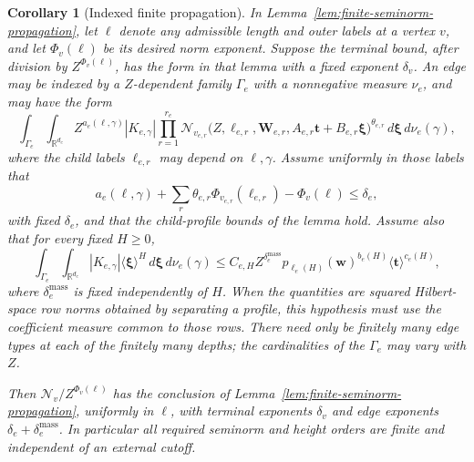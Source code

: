 \documentclass[11pt,a4paper]{article}
\numberwithin{equation}{section}
\numberwithin{figure}{section}
\newtheorem{corollary}[theorem]{Corollary}
\theoremstyle{definition}
\theoremstyle{remark}
\begin{document}
\begin{corollary}[Indexed finite propagation]
\label{cor:indexed-seminorm-propagation}
In Lemma~\ref{lem:finite-seminorm-propagation}, let
$\boldsymbol\ell$ denote any admissible length and outer labels at a vertex
$v$, and let $\Phi_v(\boldsymbol\ell)$ be its desired norm exponent.  Suppose
the terminal bound, after division by $Z^{\Phi_v(\boldsymbol\ell)}$, has the
form in that lemma with a fixed exponent $\delta_v$.  An edge may be indexed
by a $Z$-dependent family $\Gamma_e$ with a nonnegative measure $\nu_e$, and
may have the form
\[
 \int_{\Gamma_e}\int_{\mathbb R^{d_e}}
 Z^{a_e(\boldsymbol\ell,\gamma)}|K_{e,\gamma}|
 \prod_{r=1}^{r_e}\mathcal N_{v_{e,r}}
  \bigl(Z,\boldsymbol\ell_{e,r},\boldsymbol W_{e,r},
        A_{e,r}\boldsymbol t+B_{e,r}\boldsymbol\xi\bigr)^{\theta_{e,r}}
 \,d\boldsymbol\xi\,d\nu_e(\gamma),
\]
where the child labels $\boldsymbol\ell_{e,r}$ may depend on
$\boldsymbol\ell,\gamma$.  Assume uniformly in those labels that
\begin{equation}\label{eq:indexed-exponent-defect}
 a_e(\boldsymbol\ell,\gamma)
   +\sum_r\theta_{e,r}\Phi_{v_{e,r}}(\boldsymbol\ell_{e,r})
   -\Phi_v(\boldsymbol\ell)\le\delta_e,
\end{equation}
with fixed $\delta_e$, and that the child-profile bounds of the lemma hold.
Assume also that for every fixed $H\ge0$,
\begin{equation}\label{eq:indexed-coefficient-measure}
 \int_{\Gamma_e}\int_{\mathbb R^{d_e}}|K_{e,\gamma}|
       \langle\boldsymbol\xi\rangle^H\,d\boldsymbol\xi\,d\nu_e(\gamma)
 \le C_{e,H}Z^{\delta_e^{\mathrm{mass}}}
       p_{\ell_e(H)}(\boldsymbol w)^{b_e(H)}
       \langle\boldsymbol t\rangle^{c_e(H)},
\end{equation}
where $\delta_e^{\mathrm{mass}}$ is fixed independently of $H$.  When the
quantities are squared Hilbert-space row norms obtained by separating a
profile, this hypothesis must use the coefficient measure common to those
rows.  There need only be finitely many edge types at each
of the finitely many depths; the cardinalities of the $\Gamma_e$ may vary
with $Z$.

Then $\mathcal N_v/Z^{\Phi_v(\boldsymbol\ell)}$ has the conclusion of
Lemma~\ref{lem:finite-seminorm-propagation}, uniformly in
$\boldsymbol\ell$, with terminal exponents $\delta_v$ and edge exponents
$\delta_e+\delta_e^{\mathrm{mass}}$.  In particular all required seminorm
and height orders are finite and independent of an external cutoff.
\end{corollary}
\end{document}

